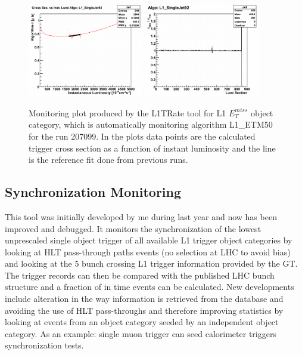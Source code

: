 \begin{figure}[!htb]
\centering
\includegraphics[width=0.45\textwidth]{Chapter03/L1TOnline/Images/Run177878_Jet_CrossSection.png}
\includegraphics[width=0.45\textwidth]{Chapter03/L1TOnline/Images/Run177878_Jet_RateCertification.png}
\caption{Monitoring plot produced by the L1TRate tool for L1 $E_T^{miss}$ object category, which is automatically
monitoring algorithm L1\_ETM50 for the run 207099. In the plots data points are the calculated trigger cross
section as a function of instant luminosity and the line is the reference fit done from previous runs.}
\label{figure_ServiceWork_L1TRate}
\end{figure}

\subsection{Synchronization Monitoring}

This tool was initially developed by me during last year and now has been improved and debugged. It monitors
the synchronization of the lowest unprescaled single object trigger of all available L1 trigger object categories
by looking at \gls{HLT} pass-through paths events (no selection at \gls{LHC} to avoid bias) and looking at the 5 bunch crossing
L1 trigger information provided by the GT. The trigger records can then be compared with the published LHC bunch
structure and a fraction of in time events can be calculated. New developments include alteration in the way
information is retrieved from the database and avoiding the use of \gls{HLT} pass-throughs and therefore improving statistics
by looking at events from an object category seeded by an independent object category. As an example: single muon
trigger can seed calorimeter triggers synchronization tests.

